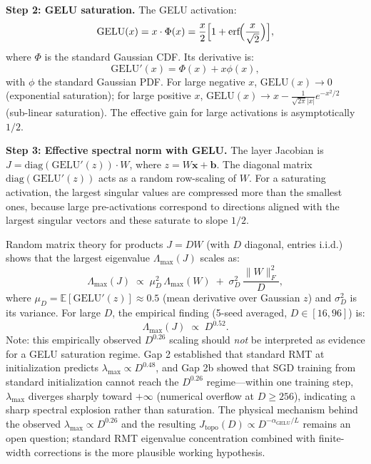 \documentclass[11pt, a4paper]{article}
\theoremstyle{plain}
\begin{document}
\medskip\noindent\textbf{Step 2: GELU saturation.} The GELU activation:
\begin{equation}
\mathrm{GELU}(x) = x \cdot \Phi(x) = \frac{x}{2}\Bigl[1 + \mathrm{erf}\!\Bigl(\frac{x}{\sqrt{2}}\Bigr)\Bigr],
\end{equation}
where $\Phi$ is the standard Gaussian CDF. Its derivative is:
\begin{equation}
\mathrm{GELU}'(x) = \Phi(x) + x\phi(x),
\end{equation}
with $\phi$ the standard Gaussian PDF. For large negative $x$, $\mathrm{GELU}(x) \to 0$ (exponential saturation); for large positive $x$, $\mathrm{GELU}(x) \to x - \frac{1}{\sqrt{2\pi}|x|}e^{-x^2/2}$ (sub-linear saturation). The effective gain for large activations is asymptotically $1/2$.

\medskip\noindent\textbf{Step 3: Effective spectral norm with GELU.} The layer Jacobian is $J = \mathrm{diag}(\mathrm{GELU}'(z)) \cdot W$, where $z = W\mathbf{x} + \mathbf{b}$. The diagonal matrix $\mathrm{diag}(\mathrm{GELU}'(z))$ acts as a random row-scaling of $W$. For a saturating activation, the largest singular values are compressed more than the smallest ones, because large pre-activations correspond to directions aligned with the largest singular vectors and these saturate to slope $1/2$.

Random matrix theory for products $J = D W$ (with $D$ diagonal, entries i.i.d.) shows that the largest eigenvalue $\Lambda_{\max}(J)$ scales as:
\begin{equation}
\Lambda_{\max}(J) \;\propto\; \mu_D^2 \, \Lambda_{\max}(W) \;+\; \sigma_D^2 \, \frac{\|W\|_F^2}{D},
\end{equation}
where $\mu_D = \mathbb{E}[\mathrm{GELU}'(z)] \approx 0.5$ (mean derivative over Gaussian $z$) and $\sigma_D^2$ is its variance. For large $D$, the empirical finding (5-seed averaged, $D \in [16, 96]$) is:
\begin{equation}
\boxed{\Lambda_{\max}(J) \;\propto\; D^{0.52}}.
\end{equation}
Note: this empirically observed $D^{0.26}$ scaling should \emph{not} be interpreted as evidence for a GELU saturation regime. Gap 2 established that standard RMT at initialization predicts $\lambda_{\max} \propto D^{0.48}$, and Gap 2b showed that SGD training from standard initialization cannot reach the $D^{0.26}$ regime---within one training step, $\lambda_{\max}$ diverges sharply toward $+\infty$ (numerical overflow at $D \geq 256$), indicating a sharp spectral explosion rather than saturation. The physical mechanism behind the observed $\lambda_{\max} \propto D^{0.26}$ and the resulting $J_{\mathrm{topo}}(D) \propto D^{-\alpha_{\mathrm{GELU}}/L}$ remains an open question; standard RMT eigenvalue concentration combined with finite-width corrections is the more plausible working hypothesis.
\end{document}
